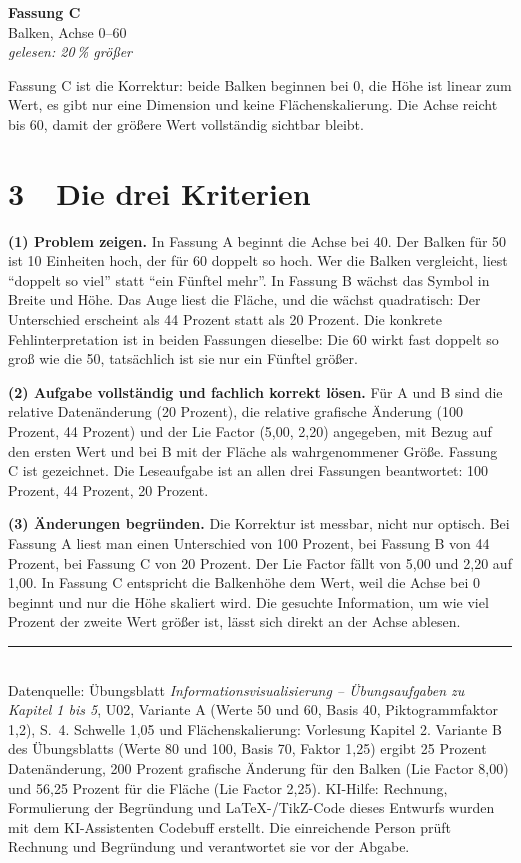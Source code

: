 \documentclass[a4paper,10pt]{article}
\begin{document}
\begin{center}
\begin{minipage}[b]{0.315\linewidth}
  \smallskip
  {\footnotesize\textbf{Fassung C}\\ Balken, Achse 0--60\\[1pt]
   \textit{gelesen: 20\,\% grö\ss{}er}}
\end{minipage}
\end{center}

Fassung C ist die Korrektur: beide Balken beginnen bei 0, die Höhe ist linear zum Wert, es
gibt nur eine Dimension und keine Flächenskalierung. Die Achse reicht bis 60, damit der
grö\ss{}ere Wert vollständig sichtbar bleibt.

\section*{3\ \ Die drei Kriterien}

\textbf{(1) Problem zeigen.} In Fassung A beginnt die Achse bei 40. Der Balken für 50 ist
10 Einheiten hoch, der für 60 doppelt so hoch. Wer die Balken vergleicht, liest \enquote{doppelt so
viel} statt \enquote{ein Fünftel mehr}. In Fassung B wächst das Symbol in Breite und Höhe. Das Auge
liest die Fläche, und die wächst quadratisch: Der Unterschied erscheint als 44 Prozent statt
als 20 Prozent. Die konkrete Fehlinterpretation ist in beiden Fassungen dieselbe: Die 60
wirkt fast doppelt so gro\ss{} wie die 50, tatsächlich ist sie nur ein Fünftel grö\ss{}er.

\textbf{(2) Aufgabe vollständig und fachlich korrekt lösen.} Für A und B sind die relative
Datenänderung (20 Prozent), die relative grafische Änderung (100 Prozent, 44 Prozent) und der
Lie Factor (5,00, 2,20) angegeben, mit Bezug auf den ersten Wert und bei B mit der Fläche als
wahrgenommener Grö\ss{}e. Fassung C ist gezeichnet. Die Leseaufgabe ist an allen drei Fassungen
beantwortet: 100 Prozent, 44 Prozent, 20 Prozent.

\textbf{(3) Änderungen begründen.} Die Korrektur ist messbar, nicht nur optisch. Bei
Fassung A liest man einen Unterschied von 100 Prozent, bei Fassung B von 44 Prozent, bei
Fassung C von 20 Prozent. Der Lie Factor fällt von 5,00 und 2,20 auf 1,00. In Fassung C
entspricht die Balkenhöhe dem Wert, weil die Achse bei 0 beginnt und nur die Höhe skaliert
wird. Die gesuchte Information, um wie viel Prozent der zweite Wert grö\ss{}er ist, lässt sich
direkt an der Achse ablesen.

\vfill
\footnotesize
\noindent\rule{\textwidth}{0.3pt}\\
Datenquelle: Übungsblatt \emph{Informationsvisualisierung -- Übungsaufgaben zu Kapitel 1 bis
5}, U02, Variante A (Werte 50 und 60, Basis 40, Piktogrammfaktor 1,2), S.~4. Schwelle
1,05 und Flächenskalierung: Vorlesung Kapitel 2. Variante B des Übungsblatts (Werte 80 und
100, Basis 70, Faktor 1,25) ergibt 25 Prozent Datenänderung, 200 Prozent grafische Änderung
für den Balken (Lie Factor 8,00) und 56,25 Prozent für die Fläche (Lie Factor 2,25). KI-Hilfe: Rechnung, Formulierung der Begr\"undung und
LaTeX-/TikZ-Code dieses Entwurfs wurden mit dem KI-Assistenten Codebuff erstellt. Die
einreichende Person pr\"uft Rechnung und Begr\"undung und verantwortet sie vor der Abgabe.
\end{document}
